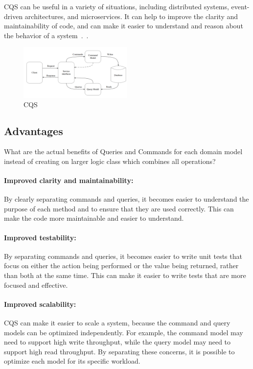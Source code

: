 \documentclass[11pt,conference]{IEEEtran}
\begin{document}
CQS can be useful in a variety of situations, including distributed systems, event-driven architectures, and microservices. It can help to improve the clarity and maintainability of code, and can make it easier to understand and reason about the behavior of a system~\cite{martinfowler-cqs}.~\cite{martinfowler-cqs}.

\begin{figure}[h]
    \centering
    \includegraphics[width=0.5\textwidth]{images/CQS.png}
    \caption{CQS~\cite[14]{cqrs-in-practise}}
    \label{fig:cqs}
\end{figure}

\subsection{Advantages}

What are the actual benefits of Queries and Commands for each domain model instead of creating on larger logic class which combines all operations?~\cite{martinfowler-cqs}

\paragraph{Improved clarity and maintainability:}
By clearly separating commands and queries, it becomes easier to understand the purpose of each method and to ensure that they are used correctly. This can make the code more maintainable and easier to understand.

\paragraph{Improved testability:}
By separating commands and queries, it becomes easier to write unit tests that focus on either the action being performed or the value being returned, rather than both at the same time. This can make it easier to write tests that are more focused and effective.

\paragraph{Improved scalability:}
CQS can make it easier to scale a system, because the command and query models can be optimized independently. For example, the command model may need to support high write throughput, while the query model may need to support high read throughput. By separating these concerns, it is possible to optimize each model for its specific workload.
\end{document}
